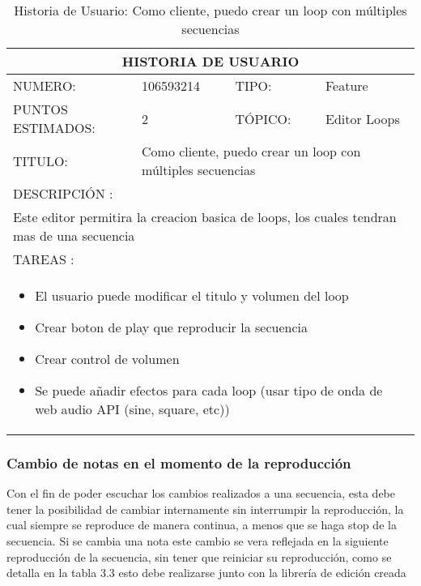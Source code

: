 \begin{table}[h]
\centering
\renewcommand{\arraystretch}{1.4}
\begin{tabular}{|*{4}{l|}}
\hline
\multicolumn{4}{|c|}{HISTORIA DE USUARIO} \\ \hline
NUMERO: & 106593214 & TIPO: & Feature \\ \hline
PUNTOS ESTIMADOS: & 2 & TÓPICO: & Editor Loops \\ \hline
TITULO: & \multicolumn{3}{|p{7.2cm}|}{Como cliente, puedo crear un loop con múltiples secuencias} \\ \hline
\multicolumn{4}{|l|}{DESCRIPCIÓN : } \\ \hline
\multicolumn{4}{|p{11cm}|}{Este editor permitira la creacion basica de loops, los cuales tendran mas de una secuencia} \\ \hline
\multicolumn{4}{|l|}{TAREAS : } \\ \hline
\multicolumn{4}{|p{11cm}|}{
\begin{minipage}[t]{\hsize}
  \begin{itemize}
    \item El usuario puede modificar el titulo y volumen del loop
    \item Crear boton de play que reproducir la secuencia
    \item Crear control de volumen
    \item Se puede añadir efectos para cada loop (usar tipo de onda de web audio API (sine, square, etc))
  \end{itemize}
\end{minipage}
} \\ \hline
\end{tabular}
\caption{Historia de Usuario: Como cliente, puedo crear un loop con múltiples secuencias}
\label{tab:Primero}
\end{table}

\subsubsection{Cambio de notas en el momento de la reproducción}

Con el fin de poder escuchar los cambios realizados a una secuencia, esta debe
tener la posibilidad de cambiar internamente sin interrumpir la reproducción,
la cual siempre se reproduce de manera continua, a menos que se haga stop
de la secuencia. Si se cambia una nota este cambio se vera reflejada en la siguiente
reproducción de la secuencia, sin tener que reiniciar su reproducción, como
se detalla en la tabla 3.3 esto debe realizarse junto con la
librería de edición creada

